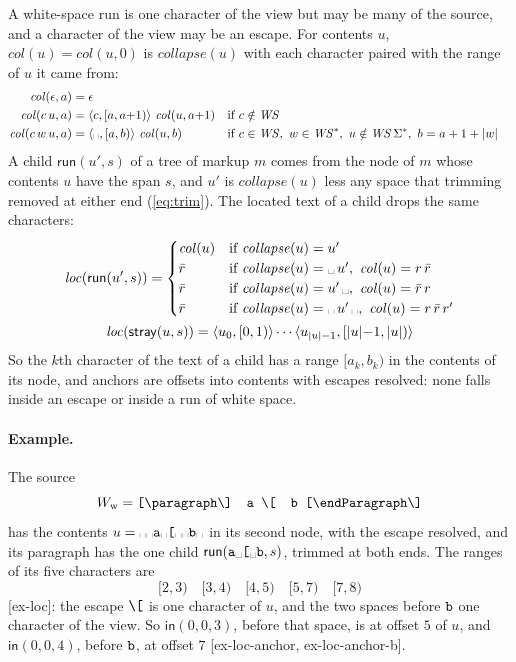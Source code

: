 \documentclass[11pt]{article}
\numberwithin{equation}{section}
\newcommand{\kw}[1]{\ensuremath{\mathsf{#1}}}
\newcommand{\str}[1]{\ensuremath{\text{\texttt{#1}}}}
\newcommand{\bs}{\textbackslash}
\newcommand{\vs}{\text{\textvisiblespace}}
\begin{document}
A white-space run is one character of the view but may be many of the
source, and a character of the view may be an escape.  For contents $u$,
$\mathit{col}(u) = \mathit{col}(u, 0)$ is $\mathit{collapse}(u)$ with each
character paired with the range of $u$ it came from:
\begin{equation}\label{eq:col}
\begin{aligned}
\mathit{col}(\epsilon, a) &= \epsilon \\
\mathit{col}(c\,u, a) &= \langle c, [a, a{+}1) \rangle\ \mathit{col}(u, a{+}1)
  && \text{if } c \notin \mathit{WS} \\
\mathit{col}(c\,w\,u, a) &= \langle \vs, [a, b) \rangle\ \mathit{col}(u, b)
  && \text{if } c \in \mathit{WS},\ w \in \mathit{WS}^*,\
     u \notin \mathit{WS}\,\Sigma^*,\ b = a + 1 + |w|
\end{aligned}
\end{equation}
A child $\kw{run}(u', s)$ of a tree of markup $m$ comes from the node of
$m$ whose contents $u$ have the span $s$, and $u'$ is
$\mathit{collapse}(u)$ less any space that trimming removed at either end
(\ref{eq:trim}).  The located text of a child drops the same characters:
\begin{equation}\label{eq:loc}
\begin{gathered}
\mathit{loc}(\kw{run}(u', s)) =
\begin{cases}
\mathit{col}(u) & \text{if } \mathit{collapse}(u) = u' \\
\bar r & \text{if } \mathit{collapse}(u) = \vs\,u',\ \mathit{col}(u) =
  r\,\bar r \\
\bar r & \text{if } \mathit{collapse}(u) = u'\,\vs,\ \mathit{col}(u) =
  \bar r\,r \\
\bar r & \text{if } \mathit{collapse}(u) = \vs\,u'\,\vs,\
  \mathit{col}(u) = r\,\bar r\,r'
\end{cases}
\\
\mathit{loc}(\kw{stray}(u, s)) = \langle u_0, [0, 1) \rangle \cdots
  \langle u_{|u|-1}, [|u|{-}1, |u|) \rangle
\end{gathered}
\end{equation}
So the $k$th character of the text of a child has a range $[a_k, b_k)$ in
the contents of its node, and anchors are offsets into contents with
escapes resolved: none falls inside an escape or inside a run of white
space.

\paragraph{Example.}  The source
\[
W_{\mathrm{w}} = \str{[\bs{}paragraph\bs]\ \ a\ \bs[\ \ b\ [\bs{}endParagraph\bs]}
\]
has the contents $u = \vs\vs\str{a}\vs\str{[}\vs\vs\str{b}\vs$ in its second node,
with the escape resolved, and its paragraph has the one child
$\kw{run}(\str{a}\vs\str{[}\vs\str{b}, s)$, trimmed at both ends.  The
ranges of its five characters are
\[
[2, 3)\quad [3, 4)\quad [4, 5)\quad [5, 7)\quad [7, 8)
\]
[ex-loc]: the escape $\str{\bs[}$ is one character of $u$, and the two
spaces before $\str{b}$ one character of the view.  So $\kw{in}(0, 0, 3)$,
before that space, is at offset $5$ of $u$, and $\kw{in}(0, 0, 4)$, before
$\str{b}$, at offset $7$ [ex-loc-anchor, ex-loc-anchor-b].
\end{document}
